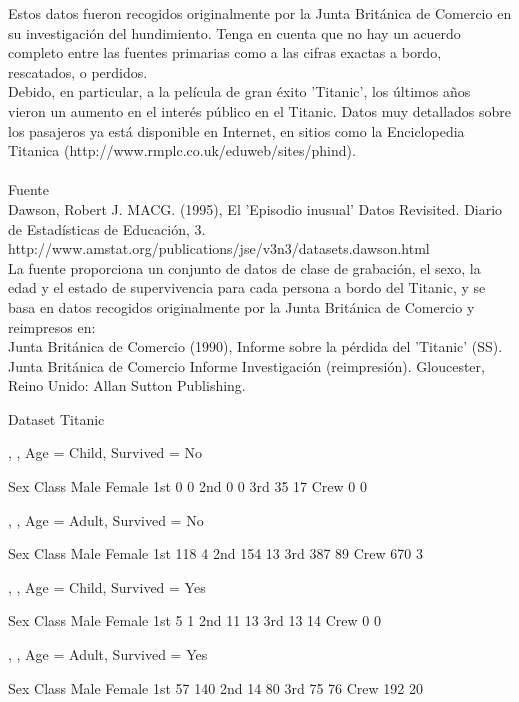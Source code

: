 \documentclass{report}
\begin{document}
\begin{justify}
Estos datos fueron recogidos originalmente por la Junta Británica de Comercio en su investigación del hundimiento. Tenga en cuenta que no hay un acuerdo completo entre las fuentes primarias como a las cifras exactas a bordo, rescatados, o perdidos.\\

Debido, en particular, a la película de gran éxito 'Titanic', los últimos años vieron un aumento en el interés público en el Titanic. Datos muy detallados sobre los pasajeros ya está disponible en Internet, en sitios como la Enciclopedia Titanica (http://www.rmplc.co.uk/eduweb/sites/phind).\\
\\
Fuente\\

Dawson, Robert J. MACG. (1995), El 'Episodio inusual' Datos Revisited. Diario de Estadísticas de Educación, 3. http://www.amstat.org/publications/jse/v3n3/datasets.dawson.html\\

La fuente proporciona un conjunto de datos de clase de grabación, el sexo, la edad y el estado de supervivencia para cada persona a bordo del Titanic, y se basa en datos recogidos originalmente por la Junta Británica de Comercio y reimpresos en:\\

Junta Británica de Comercio (1990), Informe sobre la pérdida del 'Titanic' (SS). Junta Británica de Comercio Informe Investigación (reimpresión). Gloucester, Reino Unido: Allan Sutton Publishing.\\

\end{justify}
\newpage


\begin{center} Dataset Titanic \end{center}

\begin{Schunk}
\begin{Soutput}
, , Age = Child, Survived = No

      Sex
Class  Male Female
  1st     0      0
  2nd     0      0
  3rd    35     17
  Crew    0      0

, , Age = Adult, Survived = No

      Sex
Class  Male Female
  1st   118      4
  2nd   154     13
  3rd   387     89
  Crew  670      3

, , Age = Child, Survived = Yes

      Sex
Class  Male Female
  1st     5      1
  2nd    11     13
  3rd    13     14
  Crew    0      0

, , Age = Adult, Survived = Yes

      Sex
Class  Male Female
  1st    57    140
  2nd    14     80
  3rd    75     76
  Crew  192     20
\end{Soutput}
\end{Schunk}
\end{document}
